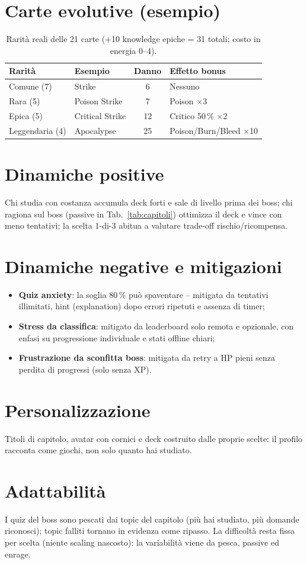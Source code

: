 \section{Carte evolutive (esempio)}
\begin{table}[ht]
\centering
\footnotesize
\begin{tabular}{@{}llcl@{}}
\toprule
Rarit\`a & Esempio & Danno & Effetto bonus \\
\midrule
Comune (7) & Strike & 6 & Nessuno \\
Rara (5) & Poison Strike & 7 & Poison $\times$3 \\
Epica (5) & Critical Strike & 12 & Critico 50\,\% $\times$2 \\
Leggendaria (4) & Apocalypse & 25 & Poison/Burn/Bleed $\times$10 \\
\bottomrule
\end{tabular}
\caption{Rarit\`a reali delle 21 carte (+10 knowledge epiche = 31 totali;
costo in energia 0--4).}
\label{tab:rarita}
\end{table}

\section{Dinamiche positive}
Chi studia con costanza accumula deck forti e sale di livello prima dei
boss; chi ragiona sul boss (passive in Tab.~\ref{tab:capitoli})
ottimizza il deck e vince con meno tentativi; la scelta 1-di-3 abitua a
valutare trade-off rischio/ricompensa.

\section{Dinamiche negative e mitigazioni}
\begin{itemize}
\item \textbf{Quiz anxiety}: la soglia 80\,\% pu\`o spaventare -- mitigata
da tentativi illimitati, hint (explanation) dopo errori ripetuti e
assenza di timer;
\item \textbf{Stress da classifica}: mitigato da leaderboard solo
remota e opzionale, con enfasi su progressione individuale e stati
offline chiari;
\item \textbf{Frustrazione da sconfitta boss}: mitigata da retry a HP
pieni senza perdita di progressi (solo senza XP).
\end{itemize}

\section{Personalizzazione}
Titoli di capitolo, avatar con cornici e deck costruito dalle proprie
scelte: il profilo racconta come giochi, non solo quanto hai studiato.

\section{Adattabilit\`a}
I quiz del boss sono pescati dai topic del capitolo (pi\`u hai studiato,
pi\`u domande riconosci); topic falliti tornano in evidenza come ripasso.
La difficolt\`a resta fissa per scelta (niente scaling nascosto): la
variabilit\`a viene da pesca, passive ed enrage.
